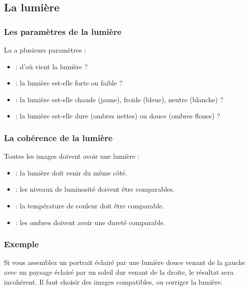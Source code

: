 \subsection{La lumière}

\subsubsection{Les paramètres de la lumière}

La  a plusieurs paramètres :

\begin{itemize}
    \item {} : d'où vient la lumière ?
    \item {} : la lumière est-elle forte ou faible ?
    \item {} : la lumière est-elle chaude (jaune), froide (bleue), neutre (blanche) ?
    \item {} : la lumière est-elle dure (ombres nettes) ou douce (ombres floues) ?
\end{itemize}

\subsubsection{La cohérence de la lumière}

Toutes les images doivent avoir une lumière  :

\begin{itemize}
    \item {} : la lumière doit venir du même côté.
    \item {} : les niveaux de luminosité doivent être comparables.
    \item {} : la température de couleur doit être comparable.
    \item {} : les ombres doivent avoir une dureté comparable.
\end{itemize}

\subsubsection{Exemple}

Si vous assemblez un portrait éclairé par une lumière douce venant de la gauche avec un paysage éclairé par un soleil dur venant de la droite, le résultat sera incohérent. Il faut choisir des images compatibles, ou corriger la lumière.

